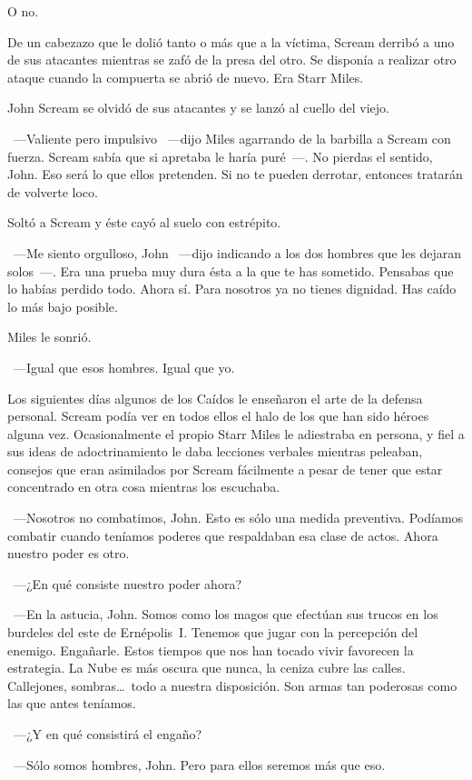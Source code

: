 O no.

De un cabezazo que le dolió tanto o más que a la víctima, Scream derribó a uno de sus atacantes mientras se zafó de la presa del otro. Se disponía a realizar otro ataque cuando la compuerta se abrió de nuevo. Era Starr Miles.

John Scream se olvidó de sus atacantes y se lanzó al cuello del viejo.

~---Valiente pero impulsivo ~---dijo Miles agarrando de la barbilla a Scream con fuerza. Scream sabía que si apretaba le haría puré~---. No pierdas el sentido, John. Eso será lo que ellos pretenden. Si no te pueden derrotar, entonces tratarán de volverte loco.

Soltó a Scream y éste cayó al suelo con estrépito.

~---Me siento orgulloso, John ~---dijo indicando a los dos hombres que les dejaran solos~---. Era una prueba muy dura ésta a la que te has sometido. Pensabas que lo habías perdido todo. Ahora sí. Para nosotros ya no tienes dignidad. Has caído lo más bajo posible.

Miles le sonrió.

~---Igual que esos hombres. Igual que yo.

Los siguientes días algunos de los Caídos le enseñaron el arte de la defensa personal. Scream podía ver en todos ellos el halo de los que han sido héroes alguna vez. Ocasionalmente el propio Starr Miles le adiestraba en persona, y fiel a sus ideas de adoctrinamiento le daba lecciones verbales mientras peleaban, consejos que eran asimilados por Scream fácilmente a pesar de tener que estar concentrado en otra cosa mientras los escuchaba.

~---Nosotros no combatimos, John. Esto es sólo una medida preventiva. Podíamos combatir cuando teníamos poderes que respaldaban esa clase de actos. Ahora nuestro poder es otro.

~---¿En qué consiste nuestro poder ahora?

~---En la astucia, John. Somos como los magos que efectúan sus trucos en los burdeles del este de Ernépolis~I. Tenemos que jugar con la percepción del enemigo. Engañarle. Estos tiempos que nos han tocado vivir favorecen la estrategia. La Nube es más oscura que nunca, la ceniza cubre las calles. Callejones, sombras\dots\ todo a nuestra disposición. Son armas tan poderosas como las que antes teníamos.

~---¿Y en qué consistirá el engaño?

~---Sólo somos hombres, John. Pero para ellos seremos más que eso.

